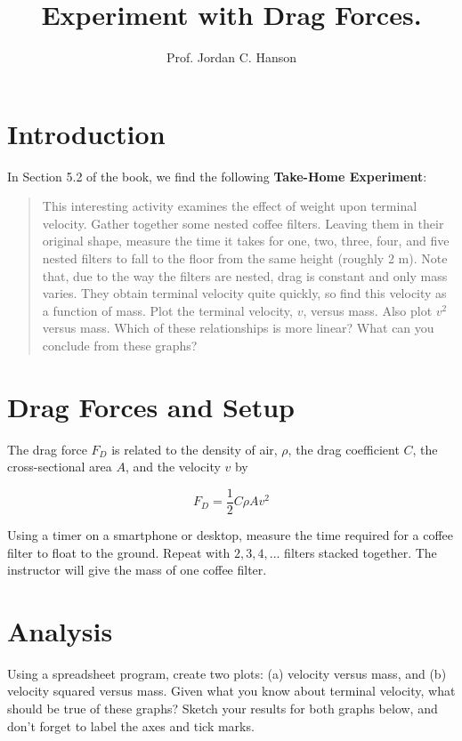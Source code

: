 \documentclass{article}
\begin{document}
\title{Experiment with Drag Forces.}
\author{Prof. Jordan C. Hanson}

\maketitle

\section{Introduction}

In Section 5.2 of the book, we find the following \textbf{Take-Home Experiment}:

\begin{quote}
This interesting activity examines the effect of weight upon terminal velocity. Gather together some nested coffee filters. Leaving them in their original shape, measure the time it takes for one, two, three, four, and five nested filters to fall to the floor from the same height (roughly 2 m).  Note that, due to the way the filters are nested, drag is constant and only mass varies. They obtain terminal velocity quite quickly, so find this velocity as a function of mass.  Plot the terminal velocity, $v$, versus mass. Also plot $v^2$ versus mass.  Which of these relationships is more linear? What can you conclude from these graphs?
\end{quote}

\section{Drag Forces and Setup}

The drag force $F_D$ is related to the density of air, $\rho$, the drag coefficient $C$, the cross-sectional area $A$, and the velocity $v$ by

\begin{equation}
F_D = \frac{1}{2}C\rho A v^2
\end{equation}

Using a timer on a smartphone or desktop, measure the time required for a coffee filter to float to the ground.  Repeat with $2, 3, 4, ... $ filters stacked together.  The instructor will give the mass of one coffee filter.

\section{Analysis}

Using a spreadsheet program, create two plots: (a) velocity versus mass, and (b) velocity squared versus mass.  Given what you know about terminal velocity, what should be true of these graphs?  Sketch your results for both graphs below, and don't forget to label the axes and tick marks.
\end{document}
